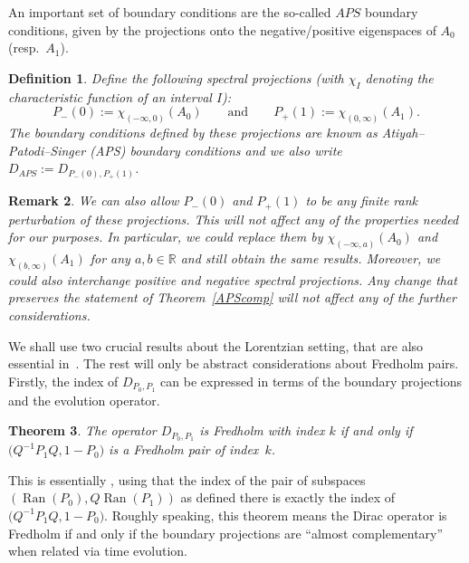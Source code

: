 \documentclass[pdftex]{sigma}
\numberwithin{equation}{section}
\newtheorem{Theorem}{Theorem}[section]
\newtheorem{Definition}[Theorem]{Definition}
\newtheorem{Remark}[Theorem]{Remark} }
\DeclareMathOperator{\Ran}{Ran}
\begin{document}
	 An important set of boundary conditions are the so-called $APS$ boundary conditions, given by the projections onto the negative/positive eigenspaces of $A_0$ (resp.\ $A_1$).
	\begin{Definition}
		Define the following spectral projections (with $\chi_I$ denoting the characteristic function of an interval $I$):
		\[P_-(0):=\chi_{(-\infty,0)}(A_0)\qquad \text{and}\qquad P_+(1):=\chi_{(0,\infty)}(A_1).\]
		The boundary conditions defined by these projections are known as Atiyah--Patodi--Singer (APS) boundary conditions and we also write $D_{APS}:=D_{P_-(0),P_+(1)}$.
	\end{Definition}
	\begin{Remark}
		We can also allow $P_-(0)$ and $P_+(1)$ to be any finite rank perturbation of these projections. This will not affect any of the properties needed for our purposes. In particular, we could replace them by $\chi_{(-\infty,a)}(A_0)$ and $\chi_{(b,\infty)}(A_1)$ for any $a,b\in \mathbb{R}$ and still obtain the same results. Moreover, we could also interchange positive and negative spectral projections. Any change that preserves the statement of Theorem~\ref{APScomp} will not affect any of the further considerations.
	\end{Remark}

	We shall use two crucial results about the Lorentzian setting, that are also essential in~\cite{BH}. The rest will only be abstract considerations about Fredholm pairs.
	Firstly, the index of $D_{P_0,P_1}$ can be expressed in terms of the boundary projections and the evolution operator.
	\begin{Theorem}
		\label{bdyindex}
		The operator $D_{P_0,P_1}$ is Fredholm with index $k$ if and only if
        $
        \bigl(Q^{-1}P_1Q,1-P_0\bigr)$
        is a Fredholm pair of index~$k$.
	\end{Theorem}
	This is essentially \cite[Theorem 4.2]{BH}, using that the index of the pair of subspaces $(\Ran(P_0),\allowbreak Q\Ran(P_1))$ as defined there is exactly the index of $\bigl(Q^{-1}P_1Q,1-P_0\bigr)$.
	Roughly speaking, this theorem means the Dirac operator is Fredholm if and only if the boundary projections are ``almost complementary'' when related via time evolution.
\end{document}
